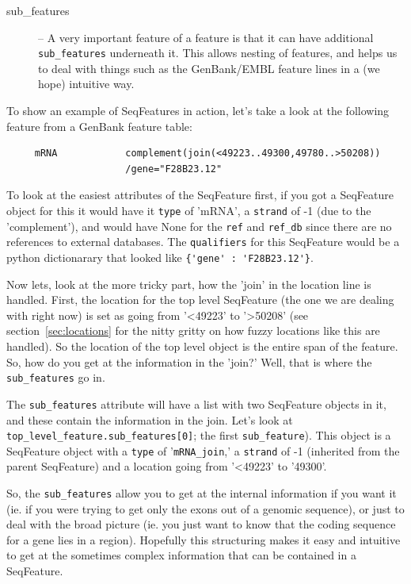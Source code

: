 \documentclass{report}
\begin{document}
\begin{description}
  \item[sub\_features] -- A very important feature of a feature is that it can have additional \verb|sub_features| underneath it. This allows nesting of features, and helps us to deal with things such as the GenBank/EMBL feature lines in a (we hope) intuitive way.
\end{description}

To show an example of SeqFeatures in action, let's take a look at the following feature from a GenBank feature table:

\begin{verbatim}
     mRNA            complement(join(<49223..49300,49780..>50208))
                     /gene="F28B23.12"
\end{verbatim}

To look at the easiest attributes of the SeqFeature first, if you got a SeqFeature object for this it would have it \verb|type| of 'mRNA', a \verb|strand| of -1 (due to the 'complement'), and would have None for the \verb|ref| and \verb|ref_db| since there are no references to external databases. The \verb|qualifiers| for this SeqFeature would be a python dictionarary that looked like \verb|{'gene' : 'F28B23.12'}|.


Now lets, look at the more tricky part, how the 'join' in the location line is handled. First, the location for the top level SeqFeature (the one we are dealing with right now) is set as going from '<49223' to '>50208' (see section~\ref{sec:locations} for the nitty gritty on how fuzzy locations like this are handled). So the location of the top level object is the entire span of the feature. So, how do you get at the information in the 'join?' Well, that is where the \verb|sub_features| go in.


The \verb|sub_features| attribute will have a list with two SeqFeature objects in it, and these contain the information in the join. Let's look at \verb|top_level_feature.sub_features[0]|; the first \verb|sub_feature|). This object is a SeqFeature object with a \verb|type| of '\verb|mRNA_join|,' a \verb|strand| of -1 (inherited from the parent SeqFeature) and a location going from '<49223' to '49300'. 


So, the \verb|sub_features| allow you to get at the internal information if you want it (ie. if you were trying to get only the exons out of a genomic sequence), or just to deal with the broad picture (ie. you just want to know that the coding sequence for a gene lies in a region). Hopefully this structuring makes it easy and intuitive to get at the sometimes complex information that can be contained in a SeqFeature.
\end{document}
